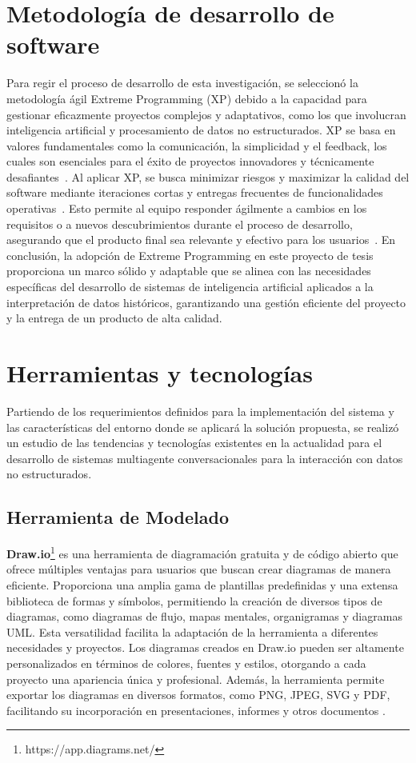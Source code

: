 \section{Metodología de desarrollo de software}

Para regir el proceso de desarrollo de esta investigación, se seleccionó la metodología ágil Extreme Programming (XP) debido a la capacidad para gestionar eficazmente proyectos complejos y adaptativos, como los que involucran inteligencia artificial y procesamiento de datos no estructurados. XP se basa en valores fundamentales como la comunicación, la simplicidad y el feedback, los cuales son esenciales para el éxito de proyectos innovadores y técnicamente desafiantes~\cite{agilealliance_xp}. Al aplicar XP, se busca minimizar riesgos y maximizar la calidad del software mediante iteraciones cortas y entregas frecuentes de funcionalidades operativas~\cite{wikipedia_xp}. Esto permite al equipo responder ágilmente a cambios en los requisitos o a nuevos descubrimientos durante el proceso de desarrollo, asegurando que el producto final sea relevante y efectivo para los usuarios~\cite{agilealliance_xp}.
En conclusión, la adopción de Extreme Programming en este proyecto de tesis proporciona un marco sólido y adaptable que se alinea con las necesidades específicas del desarrollo de sistemas de inteligencia artificial aplicados a la interpretación de datos históricos, garantizando una gestión eficiente del proyecto y la entrega de un producto de alta calidad.

\section{Herramientas y tecnologías}

Partiendo de los requerimientos definidos para la implementación del sistema y las características del entorno donde se aplicará la solución propuesta, se realizó un estudio de las tendencias y tecnologías existentes en la actualidad para el desarrollo de sistemas multiagente conversacionales para la interacción con datos no estructurados.

\subsection{Herramienta de Modelado}

\textbf{Draw.io}\footnote{https://app.diagrams.net/} es una herramienta de diagramación gratuita y de código abierto que ofrece múltiples ventajas para usuarios que buscan crear diagramas de manera eficiente. Proporciona una amplia gama de plantillas predefinidas y una extensa biblioteca de formas y símbolos, permitiendo la creación de diversos tipos de diagramas, como diagramas de flujo, mapas mentales, organigramas y diagramas UML. Esta versatilidad facilita la adaptación de la herramienta a diferentes necesidades y proyectos. Los diagramas creados en Draw.io pueden ser altamente personalizados en términos de colores, fuentes y estilos, otorgando a cada proyecto una apariencia única y profesional. Además, la herramienta permite exportar los diagramas en diversos formatos, como PNG, JPEG, SVG y PDF, facilitando su incorporación en presentaciones, informes y otros documentos \cite{drawio}.

